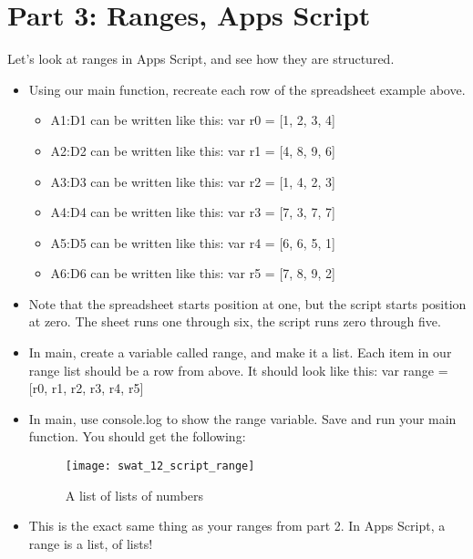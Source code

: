 \documentclass{article}
\begin{document}
\section*{Part 3: Ranges, Apps Script}
Let's look at ranges in Apps Script, and see how they are structured.
\begin{itemize}
    \item Using our main function, recreate each row of the spreadsheet example above.
    \begin{itemize}
    		\item A1:D1 can be written like this:  var r0 = [1, 2, 3, 4]
    		\item A2:D2 can be written like this:  var r1 = [4, 8, 9, 6]
    		\item A3:D3 can be written like this:  var r2 = [1, 4, 2, 3]
    		\item A4:D4 can be written like this:  var r3 = [7, 3, 7, 7]
    		\item A5:D5 can be written like this:  var r4 = [6, 6, 5, 1]
    		\item A6:D6 can be written like this:  var r5 = [7, 8, 9, 2]
    \end{itemize}
    \item Note that the spreadsheet starts position at one, but the script starts position at zero.  The sheet runs one through six, the script runs zero through five. 
    \item In main, create a variable called range, and make it a list.  Each item in our range list should be a row from above.  It should look like this:  var range = [r0, r1, r2, r3, r4, r5]
    \item In main, use console.log to show the range variable.  Save and run your main function.  You should get the following:
    \begin{figure}[H]
  		\centering
  		\texttt{[image: swat\_12\_script\_range]}
  		\caption{A list of lists of numbers}
	\end{figure}
	\item This is the exact same thing as your ranges from part 2.  In Apps Script, a range is a list, of lists!  
\end{itemize}
\end{document}
